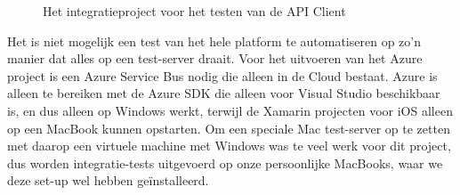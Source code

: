 \begin{figure}[ht]
\centering
{}


\caption{Het integratieproject voor het testen van de API Client}
\label{fig:integratie-project}
\end{figure}

Het is niet mogelijk een test van het hele platform te automatiseren op zo'n manier dat alles op een test-server draait. Voor het uitvoeren van het Azure project is een Azure Service Bus nodig die alleen in de Cloud bestaat. Azure is alleen te bereiken met de Azure SDK die alleen voor Visual Studio beschikbaar is, en dus alleen op Windows werkt, terwijl de Xamarin projecten voor iOS alleen op een MacBook kunnen opstarten. Om een speciale Mac test-server op te zetten met daarop een virtuele machine met Windows was te veel werk voor dit project, dus worden integratie-tests uitgevoerd op onze persoonlijke MacBooks, waar we deze set-up wel hebben geïnstalleerd.

